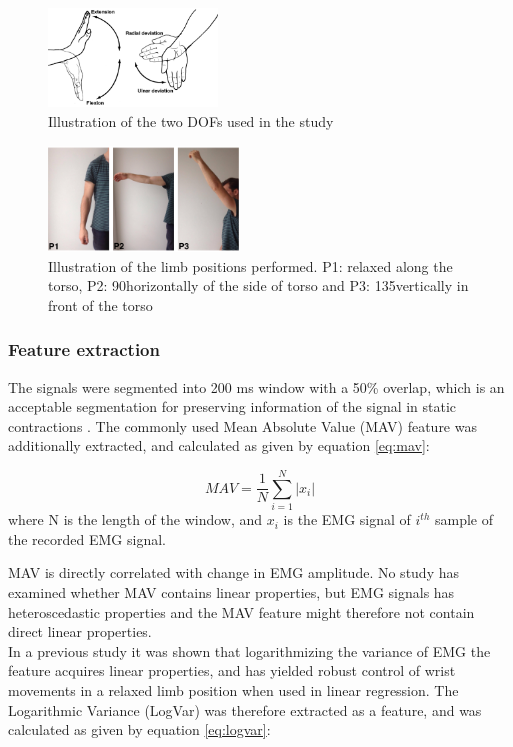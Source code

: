 \begin{multicols}{2}
\begin{figure}[H]
	\centering
	\includegraphics[width=0.4\textwidth]{figures/paperFigures/wristmovement}  %
	\caption{Illustration of the two DOFs used in the study}
	\label{fig:wristmovement}  %
\end{figure}

\begin{figure}[H]
	\centering
	\includegraphics[width=0.45\textwidth]{figures/paperFigures/limb_pos}  %
	\caption{Illustration of the limb positions performed. P1: relaxed along the torso, P2: 90\textdegree horizontally of the side of torso and P3: 135\textdegree vertically in front of the torso}
	\label{fig:limbpositions}  %
\end{figure}

\subsubsection*{Feature extraction}
The signals were segmented into 200 ms window with a 50\% overlap, which is an acceptable segmentation for preserving information of the signal in static contractions \cite{Farfan2010}.
The commonly used Mean Absolute Value (MAV) feature was additionally extracted, and calculated as given by equation \ref{eq:mav}: \cite{Zecca2002} 

\begin{equation} \label{eq:mav}
MAV = \frac{1}{N}\sum\limits_{i=1}^N|x_i|
\end{equation}
where N is the length of the window, and $x_i$ is the EMG signal of $i^{th}$ sample of the recorded EMG signal.

MAV is directly correlated with change in EMG amplitude. No study has examined whether MAV contains linear properties, but EMG signals has heteroscedastic properties \cite{rasool2012} and the MAV feature might therefore not contain direct linear properties. \\
In a previous study \cite{hahne2014} it was shown that logarithmizing the variance of EMG the feature acquires linear properties, and has yielded robust control of wrist movements in a relaxed limb position when used in linear regression. The Logarithmic Variance (LogVar) was therefore extracted as a feature, and was calculated as given by equation \ref{eq:logvar}:


\end{multicols}
